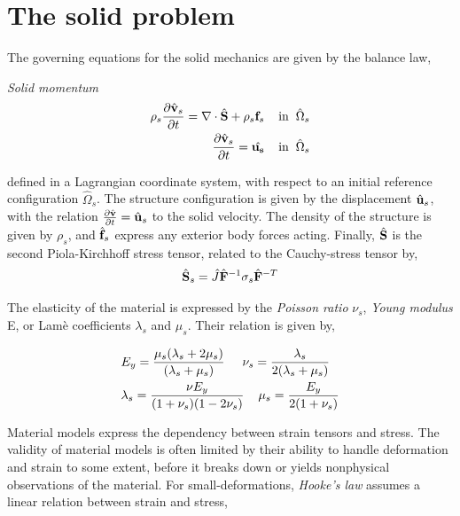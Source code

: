 \section{The solid problem}

The governing equations for the solid mechanics are given by the balance law,
\begin{equat}
\textit{Solid momentum}
\begin{align}
\rho_s \frac{\partial \hat{\mathbf{v}}_s}{\partial t} = \nabla \cdot \hat{\mathbf{S}} + \rho_s \mathbf{f}_s
\hspace{4mm} \text{in} \hspace{2mm} \hat{\Omega}_s \\
\frac{\partial \hat{\mathbf{v}}_s}{\partial t} = \hat{\mathbf{u_s}} \hspace{4mm} \text{in} \hspace{2mm}  \hat{\Omega}_s
\end{align}
\end{equat}
defined in a Lagrangian coordinate system, with respect to an initial reference configuration $\hat{\Omega}_s$. The structure configuration is given by the displacement $\hat{\mathbf{u}}_s$, with the relation $\frac{\partial \hat{\mathbf{v}}}{\partial t} = \hat{\mathbf{u}}_s$ to the solid velocity. The density of the structure is given by $\rho_s$, and $\hat{\mathbf{f}}_s$ express any exterior body forces acting. Finally, $\hat{\mathbf{S}}$ is the second Piola-Kirchhoff stress tensor, related to the Cauchy-stress tensor by,
 \begin{align*}
 \hat{\mathbf{S}}_s = \hat{J} \hat{\mathbf{F}}^{-1} \sigma_s \hat{\mathbf{F}}^{-T}
 \end{align*}
 
The elasticity of the material is expressed by the \textit{Poisson ratio} $\nu_s$, \textit{Young modulus} E, or Lamè coefficients  $\lambda_s$ and $\mu_s$. Their relation is given by,

\begin{align*}
&E_y = \frac{ \mu_s ( \lambda_s + 2 \mu_s) }{ ( \lambda_s + \mu_s ) } 
\hspace{5mm} \nu_s = \frac{\lambda_s}{2(\lambda_s + \mu_s)} \\
&\lambda_s = \frac{\nu E_y}{(1 + \nu_s)(1 - 2\nu_s)} \hspace{4mm} \mu_s = \frac{E_y}{2(1 + \nu_s)} 
\end{align*}


Material models express the dependency between strain tensors and stress. The validity of material models is often limited by their ability to handle deformation and strain to some extent, before it breaks down or yields nonphysical observations of the material. For small-deformations,  \textit{Hooke's law} assumes a linear relation between strain and stress,

